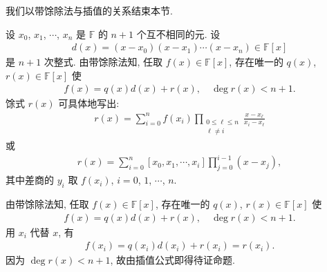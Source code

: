 我们以带馀除法与插值的关系结束本节.

\begin{proposition}
    设 $x_0$, $x_1$, $\cdots$, $x_{n}$ 是 $\mathbb{F}$ 的 $n+1$ 个互不相同的元. 设
    \begin{align*}
        d(x) = (x - x_0) (x - x_1) \cdots (x - x_n) \in \mathbb{F}[x]
    \end{align*}
    是 $n+1$ 次整式. 由带馀除法知, 任取 $f(x) \in \mathbb{F}[x]$, 存在唯一的 $q(x)$, $r(x) \in \mathbb{F}[x]$ 使
    \begin{align*}
        f(x) = q(x) d(x) + r(x), \quad \deg r(x) < n + 1.
    \end{align*}
    馀式 $r(x)$ 可具体地写出:
    \begin{align*}
        r(x) = \sum_{i = 0}^{n} f(x_i) \prod_{\begin{smallmatrix}0 \leq \ell \leq n \\\ell \neq i\end{smallmatrix}} \frac{x - x_\ell}{x_i - x_\ell}
    \end{align*}
    或
    \begin{align*}
        r(x) = \sum_{i = 0}^{n} [x_0, x_1, \cdots, x_i] \prod_{j = 0}^{i - 1} (x - x_j),
    \end{align*}
    其中差商的 $y_i$ 取 $f(x_i)$, $i = 0$, $1$, $\cdots$, $n$.
\end{proposition}

\begin{pf}
    由带馀除法知, 任取 $f(x) \in \mathbb{F}[x]$, 存在唯一的 $q(x)$, $r(x) \in \mathbb{F}[x]$ 使
    \begin{align*}
        f(x) = q(x) d(x) + r(x), \quad \deg r(x) < n + 1.
    \end{align*}
    用 $x_i$ 代替 $x$, 有
    \begin{align*}
        f(x_i) = q(x_i) d(x_i) + r(x_i) = r(x_i).
    \end{align*}
    因为 $\deg r(x) < n + 1$, 故由插值公式即得待证命题.
\end{pf}
